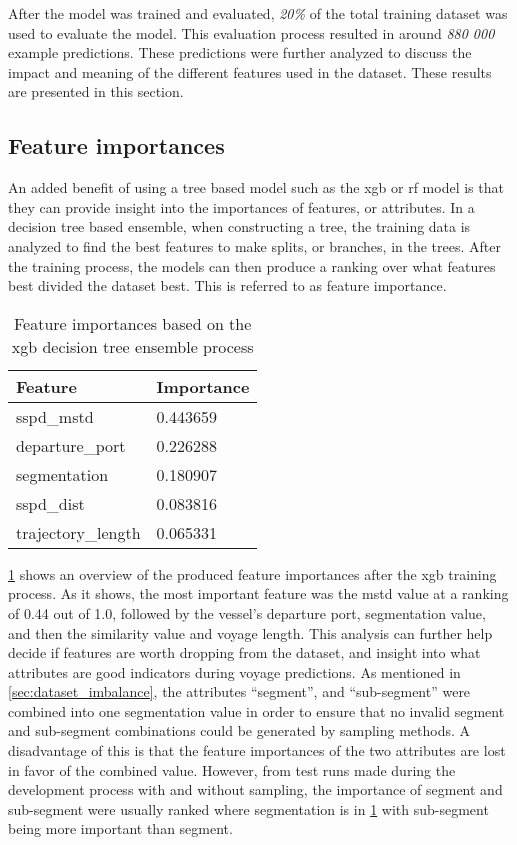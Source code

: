 After the model was trained and evaluated, \textit{20\%} of the total training dataset was used to evaluate the model. This evaluation process resulted in around \textit{880 000} example predictions. These predictions were further analyzed to discuss the impact and meaning of the different features used in the dataset. These results are presented in this section.

\subsection{Feature importances}

An added benefit of using a tree based model such as the \acrfull{xgb} or \acrfull{rf} model is that they can provide insight into the importances of features, or attributes. In a decision tree based ensemble, when constructing a tree, the training data is analyzed to find the best features to make splits, or branches, in the trees. After the training process, the models can then produce a ranking over what features best divided the dataset best. This is referred to as feature importance.

\begin{table}[htbp]
    \centering
    \begin{tabularx}{0.6\textwidth}{X X}
        \bfseries{Feature} & \bfseries{Importance} \\ \toprule
        sspd\_mstd         & 0.443659 \\ \midrule
        departure\_port    & 0.226288 \\ \midrule
        segmentation       & 0.180907 \\ \midrule
        sspd\_dist         & 0.083816 \\ \midrule
        trajectory\_length & 0.065331 \\ \bottomrule
    \end{tabularx}
    \caption{Feature importances based on the \acrshort{xgb} decision tree ensemble process}\label{tab:feature_importances}
\end{table}

\cref{tab:feature_importances} shows an overview of the produced feature importances after the \acrshort{xgb} training process. As it shows, the most important feature was the \acrshort{mstd} value at a ranking of 0.44 out of 1.0, followed by the vessel's departure port, segmentation value, and then the similarity value and voyage length. This analysis can further help decide if features are worth dropping from the dataset, and insight into what attributes are good indicators during voyage predictions. As mentioned in \cref{sec:dataset_imbalance}, the attributes ``segment'', and ``sub-segment'' were combined into one segmentation value in order to ensure that no invalid segment and sub-segment combinations could be generated by sampling methods. A disadvantage of this is that the feature importances of the two attributes are lost in favor of the combined value. However, from test runs made during the development process with and without sampling, the importance of segment and sub-segment were usually ranked where segmentation is in \cref{tab:feature_importances} with sub-segment being more important than segment.

